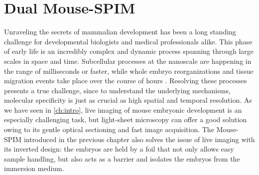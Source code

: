 

\chapter{Dual Mouse-SPIM}

\graphicspath{{./figures/2_DualMouse/}}

\label{ch:DualMouse}




Unraveling the secrets of mammalian development has been a long standing challenge for developmental biologists and medical professionals alike. 
This phase of early life is an incredibly complex and dynamic process spanning through large scales in space and time. Subcellular processes at the nanoscale are happening in the range of milliseconds or faster, while whole embryo reorganizations and tissue migration events take place over the course of hours \cite{gilbert_developmental_2013}. Resolving these processes presents a true challenge, since to understand the underlying mechanisms, molecular specificity is just as crucial as high spatial and temporal resolution.
As we have seen in \autoref{ch:intro}, live imaging of mouse embryonic development is an especially challenging task, but light-sheet microscopy can offer a good solution owing to its gentle optical sectioning and fast image acquisition. The Mouse-SPIM \cite{strnad_inverted_2016} introduced in the previous chapter also solves the issue of live imaging with its inverted design: the embryos are held by a foil that not only allows easy sample handling, but also acts as a barrier and isolates the embryos from the immersion medium.

